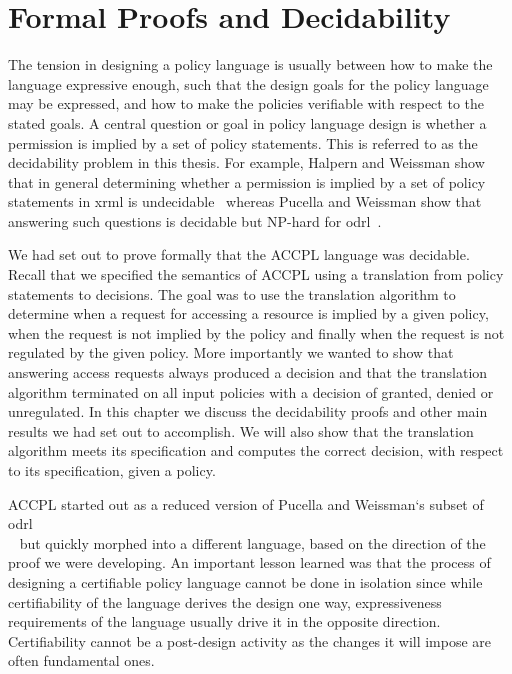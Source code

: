 \chapter{Formal Proofs and Decidability}\label{chap:results}

                  
The tension in designing a policy language is usually between how to make the language expressive enough, such that the design goals for the policy language may be expressed, and how to make the policies verifiable with respect to the stated goals. A central question or goal in policy language design is whether a permission is implied by a set of policy statements. This is referred to as the decidability problem in this thesis. For example, Halpern and Weissman show that in general determining whether a permission is implied by a set of policy statements in \ac{xrml} is undecidable~\cite{HalpernW08} whereas Pucella and Weissman show that answering such questions is decidable but NP-hard for \ac{odrl}~\cite{pucella2006}.
 

We had set out to prove formally that the \ac{ACCPL} language was decidable. Recall that we specified the semantics of \ac{ACCPL} using a translation from policy statements to decisions. The goal was to use the translation algorithm to determine when a request for accessing a resource is implied by a given policy, when the request is not implied by the policy and finally when the request is not regulated by the given policy. More importantly we wanted to show that answering access requests always produced a decision and that the translation algorithm terminated on all input policies with a decision of granted, denied or unregulated. In this chapter we discuss the decidability proofs and other main results we had set out to accomplish. We will also show that the translation algorithm meets its specification and computes the correct decision, with respect to its specification, given a policy. 


\ac{ACCPL} started out as a reduced version of Pucella and Weissman`s subset of \ac{odrl}\\~\cite{pucella2006} but quickly morphed into a different language, based on the direction of the proof we were developing. An important lesson learned was that the process of designing a certifiable policy language cannot be done in isolation since while certifiability of the language derives the design one way, expressiveness requirements of the language usually drive it in the opposite direction. Certifiability cannot be a post-design activity as the changes it will impose are often fundamental ones.

